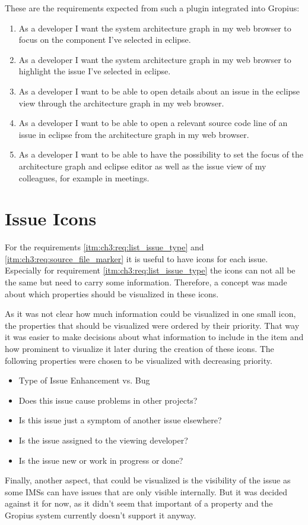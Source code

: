 These are the requirements expected from such a plugin integrated into Gropius:
\begin{enumerate}
	\setcounter{enumi}{\value{enumarteCounter}} %
	\item As a developer I want the system architecture graph in my web browser to focus on the component I've selected in eclipse.
	\item As a developer I want the system architecture graph in my web browser to highlight the issue I've selected in eclipse.
	\item As a developer I want to be able to open details about an issue in the eclipse view through the architecture graph in my web browser.
	\item As a developer I want to be able to open a relevant source code line of an issue in eclipse from the architecture graph in my web browser.
	\item As a developer I want to be able to have the possibility to set the focus of the architecture graph and eclipse editor as well as the issue view of my colleagues, for example in meetings.
\end{enumerate}

\section{Issue Icons}
\label{sec:ch3:s2}
For the requirements \ref{itm:ch3:req:list_issue_type} and \ref{itm:ch3:req:source_file_marker} it is useful to have icons for each issue.
Especially for requirement \ref{itm:ch3:req:list_issue_type} the icons can not all be the same but need to carry some information.
Therefore, a concept was made about which properties should be visualized in these icons.

As it was not clear how much information could be visualized in one small icon, 
the properties that should be visualized were ordered by their priority.
That way it was easier to make decisions about what information to include in the item and how prominent to visualize it later during the creation of these icons.
The following properties were chosen to be visualized with decreasing priority.
\begin{itemize}
	\item Type of Issue
	\subitem Enhancement vs. Bug
	\item Does this issue cause problems in other projects?
	\item Is this issue just a symptom of another issue elsewhere?
	\item Is the issue assigned to the viewing developer?
	\item Is the issue new or work in progress or done?
\end{itemize}
Finally, another aspect, that could be visualized is the visibility of the issue as some \glspl{IMS} can have issues that are only visible internally.
But it was decided against it for now, as it didn't seem that important of a property and the Gropius system currently doesn't support it anyway.

